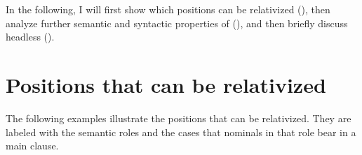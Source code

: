 In the following, I will first show which positions can be relativized (), then analyze further semantic and syntactic properties of  (), and then briefly discuss headless  (). 



\section{Positions that can be relativized}
\label{sec:Positions that can be relativized}

The following examples illustrate the positions that can be relativized. They are labeled with the semantic roles and the cases that nominals in that role bear in a main clause.
%
